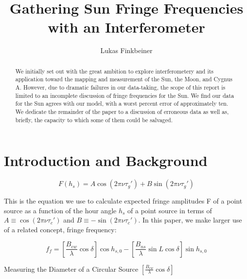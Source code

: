 \documentclass[12pt]{article}
\title{Gathering Sun Fringe Frequencies with an Interferometer}
\author{Lukas Finkbeiner}
\begin{document}
\maketitle

\begin{abstract}

We initially set out with the great ambition to explore interferometery and its application toward the mapping and measurement of the Sun, the Moon, and Cygnus A. However, due to dramatic failures in our data-taking, the scope of this report is limited to an incomplete discussion of fringe frequencies for the Sun. We find our data for the Sun agrees with our model, with a worst percent error of approximately ten. We dedicate the remainder of the paper to a discussion of erroneous data as well as, briefly, the capacity to which some of them could be salvaged.

\end{abstract}

\section{Introduction and Background}

\begin{equation}
F(h_s) = A \cos (2 \pi \nu \tau_g') + B \sin (2 \pi \nu \tau_g')
\end{equation}

This is the equation we use to calculate expected fringe amplitudes F of a point source as a function of the hour angle $h_s$ of a point source in terms of $A \equiv \cos(2 \pi \nu \tau_c')$ and $B \equiv -\sin(2 \pi \nu \tau_c')$. In this paper, we make larger use of a related concept, fringe frequency:


\begin{equation} \label{eq:lff}
f_f = \left[ \frac{B_{ew}}{\lambda} \cos \delta \right] \cos h_{s, 0} - \left[\frac{B_{ns}}{\lambda} \sin L \cos \delta\right] \sin h_{s, 0}
\end{equation}


Measuring the Diameter of a Circular Source $[\frac{B_{ew}}{\lambda} \cos \delta]$
\end{document}
